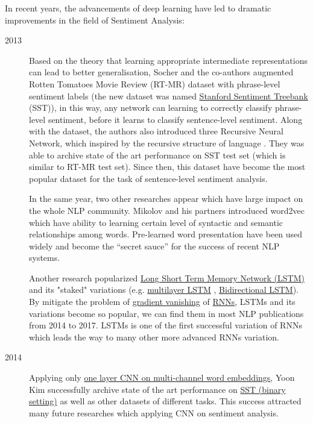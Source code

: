 In recent years, the advancements of deep learning have led to dramatic improvements in the field of Sentiment Analysis:
\begin{description}
\item [2013] Based on the theory that learning appropriate intermediate representations can lead to better generalisation\cite{knowledge-matter}\cite{tran-auto-encoder}, Socher and the co-authors augmented Rotten Tomatoes Movie Review  (RT-MR) dataset\cite{Rotten-Tomato} with phrase-level sentiment labels (the new dataset was named \hyperref[sec:sst]{Stanford Sentiment Treebank} (SST)), in this way, any network can learning to correctly classify phrase-level sentiment, before it learns to classify sentence-level sentiment\cite{socher2013recursive}. Along with the dataset, the authors also introduced three Recursive Neural Network, which inspired by the recursive structure of language \cite{socher2013recursive}.
They was able to archive state of the art performance on SST test set (which is similar to RT-MR test set). 
Since then, this dataset have become the most popular dataset for the task of sentence-level sentiment analysis.

In the same year, two other researches appear which have large impact on the whole NLP community. 
Mikolov and his partners introduced word2vec which have ability to learning certain level of syntactic and semantic relationships among words\cite{word2vec}. 
Pre-learned word presentation have been used widely and become the “secret sauce” for the success of recent NLP systems\cite{Luong_betterword}.

Another research\cite{GravesLSTM} popularized \hyperref[sec:lstm]{Long Short Term Memory Network (LSTM)} and its "staked" variations (e.g. \hyperref[sec:multilayer-lstm]{multilayer LSTM} , \hyperref[sec:bilstm]{Bidirectional LSTM}).
By mitigate the problem of \hyperref[sec:gradient-vanish]{gradient vanishing} of \hyperref[sec:RNN]{RNNs}, LSTMs and its variations become so popular, we can find them in most NLP publications from 2014 to 2017. 
LSTMs is one of the first successful variation of RNNs which leads the way to many other more advanced RNNs variation\cite{olah2016attention}.
\item [2014] Applying only \hyperref[kim-cnn]{one layer CNN on multi-channel word embeddings}, Yoon Kim successfully archive state of the art performance on \hyperref[sec:sst]{SST (binary setting)} as well as other datasets of different tasks\cite{KimCNN}. 
This success attracted many future researches which applying CNN on sentiment analysis\cite{2-layer-cnn}\cite{cnn-rnn}.


\end{description}

